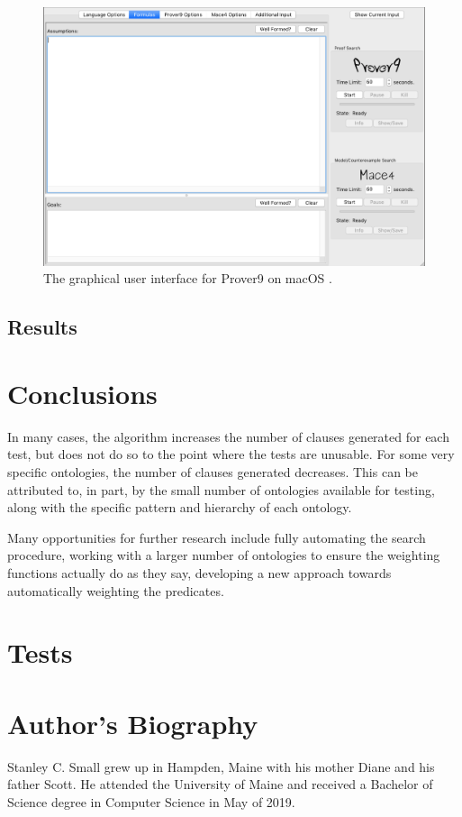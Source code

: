 \documentclass{article}
\begin{document}
\begin{figure}[h]
\centering
\includegraphics[width=6in]{prover9}
\caption{The graphical user interface for Prover9 on macOS \cite{mccune2005prover9}.}
\label{fig:prover9}
\end{figure}
		



		\subsection{Results}
	\newpage
	\section{Conclusions}

In many cases, the algorithm increases the number of clauses generated for each test, but does not do so to the point where the tests are unusable. For some very specific ontologies, the number of clauses generated decreases. This can be attributed to, in part, by the small number of ontologies available for testing, along with the specific pattern and hierarchy of each ontology. 

Many opportunities for further research include fully automating the search procedure, working with a larger number of ontologies to ensure the weighting functions actually do as they say, developing a new approach towards automatically weighting the predicates. 
	\newpage
	\printbibliography

	\newpage
	\appendix

	\section{Tests}

	\newpage
	\section*{Author's Biography}
Stanley C. Small grew up in Hampden, Maine with his mother Diane and his father Scott. He attended the University of Maine and received a Bachelor of Science degree in Computer Science in May of 2019. 
\end{document}
